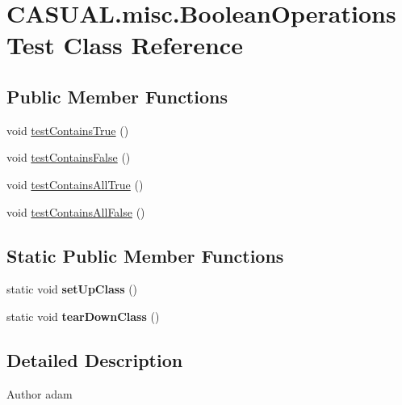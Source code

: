 \hypertarget{classCASUAL_1_1misc_1_1BooleanOperationsTest}{\section{C\-A\-S\-U\-A\-L.\-misc.\-Boolean\-Operations\-Test Class Reference}
\label{classCASUAL_1_1misc_1_1BooleanOperationsTest}
}
\subsection*{Public Member Functions}
\begin{DoxyCompactItemize}
\item 
void \hyperlink{classCASUAL_1_1misc_1_1BooleanOperationsTest_ab62a6047a5c210880852ab1241b637a7}{test\-Contains\-True} ()
\item 
void \hyperlink{classCASUAL_1_1misc_1_1BooleanOperationsTest_a0936c1a0199de2400fed118197dbd1f8}{test\-Contains\-False} ()
\item 
void \hyperlink{classCASUAL_1_1misc_1_1BooleanOperationsTest_a234d417b52c7f84043bd6cf206ecf781}{test\-Contains\-All\-True} ()
\item 
void \hyperlink{classCASUAL_1_1misc_1_1BooleanOperationsTest_a75317ddd000f48b8025c2b6c08b5b87e}{test\-Contains\-All\-False} ()
\end{DoxyCompactItemize}
\subsection*{Static Public Member Functions}
\begin{DoxyCompactItemize}
\item 
\hypertarget{classCASUAL_1_1misc_1_1BooleanOperationsTest_acd1a436a847b89427e4e266a4c45b213}{static void {\bfseries set\-Up\-Class} ()}\label{classCASUAL_1_1misc_1_1BooleanOperationsTest_acd1a436a847b89427e4e266a4c45b213}

\item 
\hypertarget{classCASUAL_1_1misc_1_1BooleanOperationsTest_a42471fc6118a8927fcf6c3534ba396de}{static void {\bfseries tear\-Down\-Class} ()}\label{classCASUAL_1_1misc_1_1BooleanOperationsTest_a42471fc6118a8927fcf6c3534ba396de}

\end{DoxyCompactItemize}


\subsection{Detailed Description}
\begin{DoxyAuthor}{Author}
adam 
\end{DoxyAuthor}


